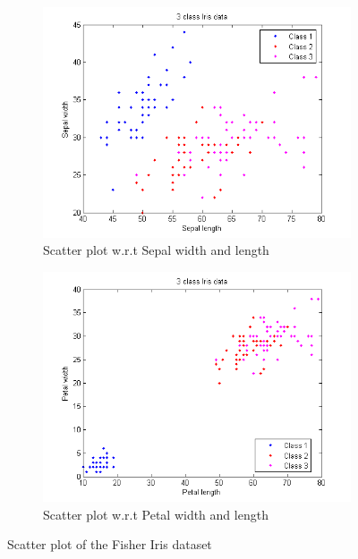 \documentclass{article} %
\begin{document}
\begin{figure}
\begin{subfigure}{.5\textwidth}
  \centering
  \includegraphics[width=\linewidth]{../Code/FisherIris/svdd/iris_1}
\caption{Scatter plot w.r.t Sepal width and length} 
\end{subfigure}%
\begin{subfigure}{.5\textwidth}
  \centering
  \includegraphics[width=\linewidth]{../Code/FisherIris/svdd/iris_2}
\caption{Scatter plot w.r.t Petal width and length}  
\end{subfigure}
\caption{Scatter plot of the Fisher Iris dataset}
\end{figure}
\end{document}
